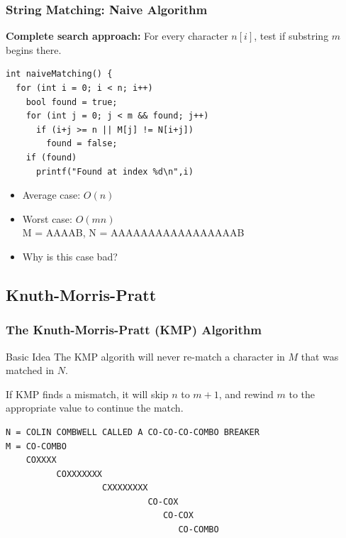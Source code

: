 \documentclass{beamer}
\begin{document}
\begin{frame}[fragile]
  \frametitle{String Matching: Naive Algorithm}

  {\bf Complete search approach:} For every character $n[i]$, test if
  substring $m$ begins there.\bigskip

  \begin{exampleblock}{}
\begin{verbatim}
int naiveMatching() {
  for (int i = 0; i < n; i++)
    bool found = true;
    for (int j = 0; j < m && found; j++)
      if (i+j >= n || M[j] != N[i+j])
        found = false;
    if (found)
      printf("Found at index %d\n",i)
\end{verbatim}
  \end{exampleblock}
    \bigskip
    \begin{itemize}
      \item Average case: $O(n)$
      \item Worst case: $O(mn)$\\M = AAAAB, N = AAAAAAAAAAAAAAAAAB
      \item Why is this case bad?
    \end{itemize}
\end{frame}

\subsection{Knuth-Morris-Pratt}
\begin{frame}[fragile]
  \frametitle{The Knuth-Morris-Pratt (KMP) Algorithm}

  \begin{block}{Basic Idea}
    The KMP algorith will never re-match a character in $M$ that was
    matched in $N$.

    \bigskip

    If KMP finds a mismatch, it will skip $n$ to $m+1$, and rewind $m$ to the
    appropriate value to continue the match.
  \end{block}

\begin{verbatim}
N = COLIN COMBWELL CALLED A CO-CO-CO-COMBO BREAKER
M = CO-COMBO
    COXXXX
          COXXXXXXX
                   CXXXXXXXX
                            CO-COX
                               CO-COX
                                  CO-COMBO
\end{verbatim}
\end{frame}
\end{document}

